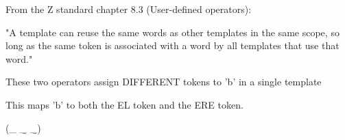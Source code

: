 From the Z standard chapter 8.3 (User-defined operators):

  "A template can reuse the same words as other templates in the same scope,
   so long as the same token is associated with a word by all templates that
   use that word."

These two operators assign DIFFERENT tokens to 'b' in a single template

This maps 'b' to both the EL token and the ERE token.
\begin{zed}
 \leftassoc (\_ \b \_ \b \_)
\end{zed}
